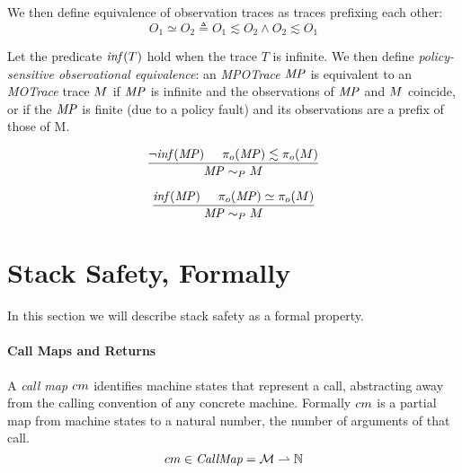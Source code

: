 \documentclass[acmsmall,review,anonymous]{acmart}\settopmatter{printfolios=true,printccs=false,printacmref=false}
\begin{document}
    
We then define equivalence of observation traces as traces prefixing each other:
\[O_1 \simeq O_2 \triangleq O_1 \lesssim O_2 \land O_2 \lesssim O_1\]



Let the predicate \(\mathit{inf}(T)\) hold when the trace $T$ is infinite.
We then define {\em policy-sensitive observational equivalence}: an
{\it MPOTrace} \(\mathit{MP}\) is equivalent to an {\it MOTrace} trace \(M\) if \(\mathit{MP}\)
is infinite and the observations of \(\mathit{MP}\) and \(M\) coincide, or if the \(\mathit{MP}\)
is finite (due to a policy fault) and its observations are a prefix of those of M.

\[\frac{\neg \mathit{inf}(\mathit{MP}) \hspace{.5cm} \pi_o(\mathit{MP}) \lesssim \pi_o(M)}
           {\mathit{MP} \sim_P M}\]
    
\[\frac{\mathit{inf}(\mathit{MP}) \hspace{.5cm} \pi_o(\mathit{MP}) \simeq \pi_o(M)}
           {\mathit{MP} \sim_P M}\]
    
\section{Stack Safety, Formally}

In this section we will describe stack safety as a formal
property.

\paragraph*{Call Maps and Returns}

A {\it call map} $cm$ identifies machine states that represent a
call, abstracting away from the calling convention of any concrete
machine. Formally $cm$ is a partial map from machine states to a
natural number, the number of arguments of that call.
%
\[cm \in \mathit{CallMap} = {\mathcal M} \rightharpoonup \mathbb{N}\]
\end{document}

